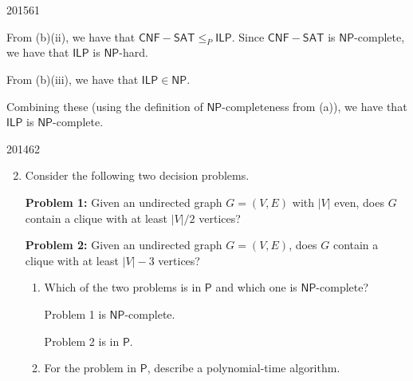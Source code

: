 \documentclass[10pt,\jkfside,a4paper]{article}
\begin{document}
\begin{examquestion}{2015}{6}{1}
\begin{enumerate}[label=(\alph*)]
\begin{enumerate}[label=(\roman*)]
From (b)(ii), we have that $\mathsf{CNF-SAT} \le_P \mathsf{ILP}$. Since
$\mathsf{CNF-SAT}$ is $\mathsf{NP}$-complete, we have that $\mathsf{ILP}$ is
$\mathsf{NP}$-hard.

From (b)(iii), we have that $\mathsf{ILP} \in \mathsf{NP}$.

Combining these (using the definition of $\mathsf{NP}$-completeness from (a)),
we have that $\mathsf{ILP}$ is $\mathsf{NP}$-complete.

\end{enumerate}

\end{enumerate}

\end{examquestion}

\begin{examquestion}{2014}{6}{2}

\begin{enumerate}[label=(\alph*)]

\setcounter{enumi}{1}

\item Consider the following two decision problems.

\vspace{1em}

\hfill\begin{minipage}{\dimexpr\textwidth-1.66cm}
\textbf{Problem 1:} Given an undirected graph $G = (V, E)$ with $|V|$ even,
does $G$ contain a clique with at least $|V|/2$ vertices?
\end{minipage}

\vspace{1em}

\hfill\begin{minipage}{\dimexpr\textwidth-1.66cm}
\textbf{Problem 2:} Given an undirected graph $G = (V, E)$, does $G$ contain
a clique with at least $|V| - 3$ vertices?
\end{minipage}

\vspace{1em}

\begin{enumerate}[label=(\roman*)]

\item Which of the two problems is in $\mathsf{P}$ and which one is
$\mathsf{NP}$-complete?

Problem 1 is $\mathsf{NP}$-complete.

Problem 2 is in $\mathsf P$.

\item For the problem in $\mathsf{P}$, describe a polynomial-time algorithm.


\end{enumerate}
\end{enumerate}
\end{examquestion}
\end{document}
